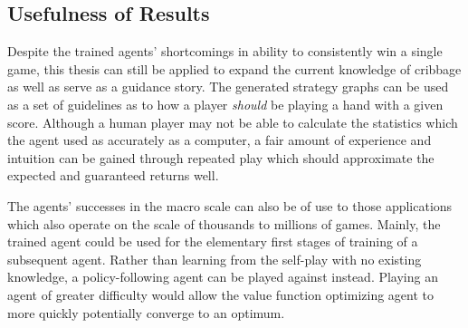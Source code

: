
\subsection{Usefulness of Results}
\label{sec:disc-usefulness}


Despite the trained agents' shortcomings in ability to consistently win
a single game,
this thesis can still be applied to expand the current
knowledge of cribbage as well as serve as a guidance story.
%
The generated strategy graphs can be used as a set of guidelines as to how a
player \textit{should} be playing a hand with a given score.
%
Although a human player may not be able to calculate the statistics which the
agent used as accurately as a computer,
a fair amount of experience and intuition can be gained through repeated
play which should approximate the expected and guaranteed returns well.

The agents' successes in the macro scale can also be of use to those
applications which also operate on the scale of thousands to millions of games.
%
Mainly,
the trained agent could be used for the elementary first stages of training
of a subsequent agent.
%
Rather than learning from the self-play with no existing knowledge,
a policy-following agent can be played against instead.
%
Playing an agent of greater difficulty would allow the value function optimizing
agent to more quickly potentially converge to an optimum.





%
